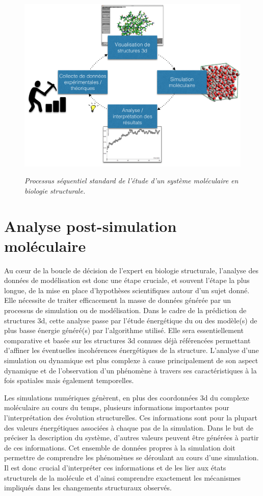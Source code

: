 \begin{figure}
  \centering
  {\includegraphics[width=.75\linewidth]{./figures/ch2/ch2_structural_biology_process}}
    \caption{{\it Processus séquentiel standard de l'étude d'un système moléculaire en biologie structurale.}}
  \label{Fig:schema_seq_bio_struct}
  \hspace{0.3cm}
\end{figure}

\section{Analyse post-simulation moléculaire}

Au cœur de la boucle de décision de l'expert en biologie structurale, l'analyse des données de modélisation est donc une étape cruciale, et souvent l'étape la plus longue, de la mise en place d'hypothèses scientifiques autour d'un sujet donné. Elle nécessite de traiter efficacement la masse de données générée par un processus de simulation ou de modélisation. Dans le cadre de la prédiction de structures 3d, cette analyse passe par l'étude énergétique du ou des modèle(s) de plus basse énergie généré(s) par l'algorithme utilisé. Elle sera essentiellement comparative et basée sur les structures 3d connues déjà référencées permettant d'affiner les éventuelles incohérences énergétiques de la structure. 
L'analyse d'une simulation ou dynamique est plus complexe à cause principalement de son aspect dynamique et de l'observation d'un phénomène à travers ses caractéristiques à la fois spatiales mais également temporelles.

Les simulations numériques génèrent, en plus des coordonnées 3d du complexe moléculaire au cours du temps, plusieurs informations importantes pour l'interprétation des évolution structurelles. Ces informations sont pour la plupart des valeurs énergétiques associées à chaque pas de la simulation. Dans le but de préciser la description du système, d'autres valeurs peuvent être générées à partir de ces informations. Cet ensemble de données propres à la simulation doit permettre de comprendre les phénomènes se déroulant au cours d'une simulation. Il est donc crucial d'interpréter ces informations et de les lier aux états structurels de la molécule et d'ainsi comprendre exactement les mécanismes impliqués dans les changements structuraux observés. 

